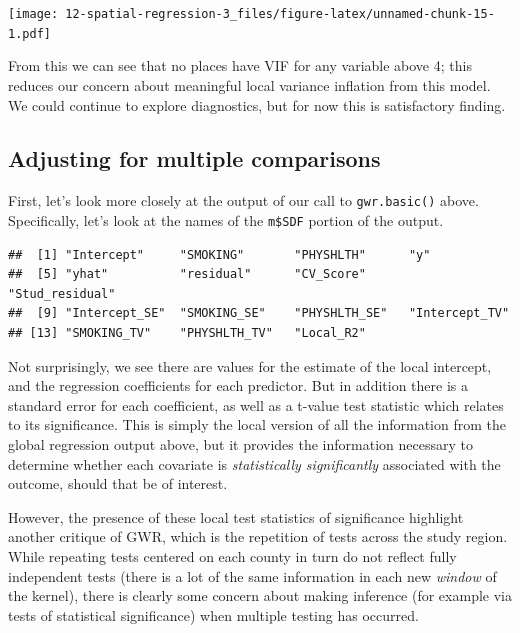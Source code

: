 \documentclass[
]{book}
\newenvironment{Shaded}{\begin{snugshade}}{\end{snugshade}}
\newcommand{\FunctionTok}[1]{\textcolor[rgb]{0.13,0.29,0.53}{\textbf{#1}}}
\newcommand{\NormalTok}[1]{#1}
\newcommand{\SpecialCharTok}[1]{\textcolor[rgb]{0.81,0.36,0.00}{\textbf{#1}}}
\begin{document}
\texttt{[image: 12-spatial-regression-3\_files/figure-latex/unnamed-chunk-15-1.pdf]}

From this we can see that no places have VIF for any variable above 4; this reduces our concern about meaningful local variance inflation from this model. We could continue to explore diagnostics, but for now this is satisfactory finding.

\hypertarget{adjusting-for-multiple-comparisons}{%
\subsection{Adjusting for multiple comparisons}\label{adjusting-for-multiple-comparisons}}

First, let's look more closely at the output of our call to \texttt{gwr.basic()} above. Specifically, let's look at the names of the \texttt{m\$SDF} portion of the output.

\begin{Shaded}
\end{Shaded}

\begin{verbatim}
##  [1] "Intercept"     "SMOKING"       "PHYSHLTH"      "y"            
##  [5] "yhat"          "residual"      "CV_Score"      "Stud_residual"
##  [9] "Intercept_SE"  "SMOKING_SE"    "PHYSHLTH_SE"   "Intercept_TV" 
## [13] "SMOKING_TV"    "PHYSHLTH_TV"   "Local_R2"
\end{verbatim}

Not surprisingly, we see there are values for the estimate of the local intercept, and the regression coefficients for each predictor. But in addition there is a standard error for each coefficient, as well as a t-value test statistic which relates to its significance. This is simply the local version of all the information from the global regression output above, but it provides the information necessary to determine whether each covariate is \emph{statistically significantly} associated with the outcome, should that be of interest.

However, the presence of these local test statistics of significance highlight another critique of GWR, which is the repetition of tests across the study region. While repeating tests centered on each county in turn do not reflect fully independent tests (there is a lot of the same information in each new \emph{window} of the kernel), there is clearly some concern about making inference (for example via tests of statistical significance) when multiple testing has occurred.
\end{document}
